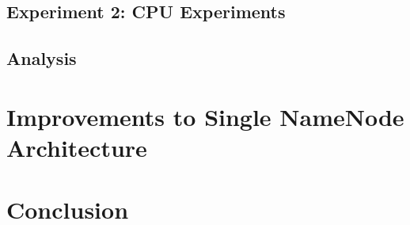 \documentclass[11pt, a4paper]{article}
\begin{document}
\begin{multicols*}{2}

\subsection{Experiment 2: CPU Experiments}


\subsection{Analysis}




\section{Improvements to Single NameNode Architecture}




% 

% 

\section{Conclusion}





\end{multicols*}
\end{document}
